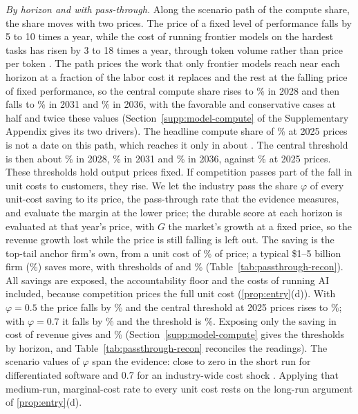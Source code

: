 \emph{By horizon and with pass-through.} Along the scenario path of the compute share, the share moves with two prices. The price of a fixed level of performance falls by 5 to 10 times a year, while the cost of running frontier models on the hardest tasks has risen by 3 to 18 times a year, through token volume rather than price per token \citep{gundlach2025price}. The path prices the work that only frontier models reach near each horizon at a fraction of the labor cost it replaces and the rest at the falling price of fixed performance, so the central compute share rises to \CcCenTwentyEight\% in 2028 and then falls to \CcCenThirtyOne\% in 2031 and \CcCenThirtySix\% in 2036, with the favorable and conservative cases at half and twice these values (Section~\ref{supp:model-compute} of the Supplementary Appendix gives its two drivers). The headline compute share of \CcCen\% at 2025 prices is not a date on this path, which reaches it only in about \CcYearSix. The central threshold is then about \GstarCenTwentyEight\% in 2028, \GstarCenThirtyOne\% in 2031 and \GstarCenThirtySix\% in 2036, against \GstarCenOne\% at 2025 prices. These thresholds hold output prices fixed. If competition passes part of the fall in unit costs to customers, they rise. We let the industry pass the share $\varphi$ of every unit-cost saving to its price, the pass-through rate that the evidence measures, and evaluate the margin at the lower price; the durable score at each horizon is evaluated at that year's price, with $G$ the market's growth at a fixed price, so the revenue growth lost while the price is still falling is left out. The saving is the top-tail anchor firm's own, from a unit cost of \PtCzero\% of price; a typical \$1--5 billion firm (\PtCzeroTyp\%) saves more, with thresholds of \PtGstarTypHalf{} and \PtGstarTypSeven\% (Table~\ref{tab:passthrough-recon}). All savings are exposed, the accountability floor and the costs of running AI included, because competition prices the full unit cost (\autoref{prop:entry}(d)). With $\varphi=0.5$ the price falls by \PtPriceCutHalf\% and the central threshold at 2025 prices rises to \GstarPhiHalfOne\%; with $\varphi=0.7$ it falls by \PtPriceCutSeven\% and the threshold is \GstarPhiSevenOne\%. Exposing only the saving in cost of revenue gives \PtGstarVarHalf{} and \PtGstarVarSeven\% (Section~\ref{supp:model-compute} gives the thresholds by horizon, and Table~\ref{tab:passthrough-recon} reconciles the readings). The scenario values of $\varphi$ span the evidence: close to zero in the short run for differentiated software \citep{choi2025dma} and 0.7 for an industry-wide cost shock \citep{ganapati2020energy}. Applying that medium-run, marginal-cost rate to every unit cost rests on the long-run argument of \autoref{prop:entry}(d).

